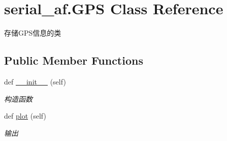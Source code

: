 \hypertarget{classserial__af_1_1_g_p_s}{}\section{serial\+\_\+af.\+G\+PS Class Reference}
\label{classserial__af_1_1_g_p_s}


存储\+G\+P\+S信息的类  


\subsection*{Public Member Functions}
\begin{DoxyCompactItemize}
\item 
def \hyperlink{classserial__af_1_1_g_p_s_af29743401202ab768a17e832a50da925}{\+\_\+\+\_\+init\+\_\+\+\_\+} (self)
\begin{DoxyCompactList}\small\item\em 构造函数 \end{DoxyCompactList}\item 
def \hyperlink{classserial__af_1_1_g_p_s_aa4d60bc2c75da65096c5bbeece8c9a27}{plot} (self)
\begin{DoxyCompactList}\small\item\em 输出 \end{DoxyCompactList}\end{DoxyCompactItemize}
